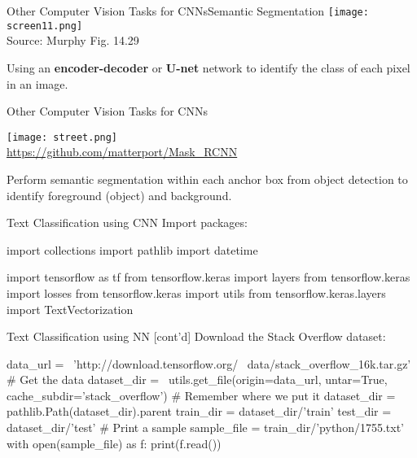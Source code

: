 \documentclass[ignorenonframetext,xcolor=x11names]{beamer}
\begin{document}
\begin{frame}{Other Computer Vision Tasks for CNNs}{Semantic Segmentation}
\texttt{[image: screen11.png]} \\

\scriptsize Source: Murphy Fig. 14.29
\normalsize
\vspace{\baselineskip}

Using an \textbf{encoder-decoder} or \textbf{U-net} network to identify the class of each pixel in an image.
\end{frame}

\begin{frame}{Other Computer Vision Tasks for CNNs}
\begin{center}
\texttt{[image: street.png]} \\

\scriptsize \url{https://github.com/matterport/Mask_RCNN}
\end{center}

\normalsize
Perform semantic segmentation within each anchor box from object detection to identify foreground (object) and background. 
\end{frame}


\begin{frame}[fragile]{Text Classification using CNN}
Import packages:
\begin{pythoncode}
import collections
import pathlib
import datetime

import tensorflow as tf
from tensorflow.keras import layers
from tensorflow.keras import losses
from tensorflow.keras import utils
from tensorflow.keras.layers import TextVectorization
\end{pythoncode}
\end{frame}

\begin{frame}[fragile]{Text Classification using NN \small [cont'd]}
Download the Stack Overflow dataset:
\begin{pythoncode}
data_url = \
'http://download.tensorflow.org/ \
data/stack_overflow_16k.tar.gz'
# Get the data
dataset_dir = \
utils.get_file(origin=data_url,
               untar=True,
               cache_subdir='stack_overflow')
# Remember where we put it
dataset_dir = pathlib.Path(dataset_dir).parent
train_dir = dataset_dir/'train'
test_dir = dataset_dir/'test'
# Print a sample
sample_file = train_dir/'python/1755.txt'
with open(sample_file) as f:
  print(f.read())
\end{pythoncode}
\end{frame}
\end{document}
